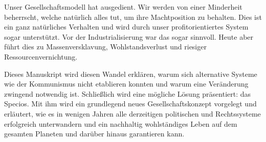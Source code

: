 Unser Gesellschaftsmodell hat ausgedient. Wir werden von einer Minderheit beherrscht, welche natürlich alles tut, um ihre Machtposition zu behalten. Dies ist ein ganz natürliches Verhalten und wird durch unser profitorientiertes System sogar unterstützt. Vor der Industrialisierung war das sogar sinnvoll. Heute aber führt dies zu Massenversklavung, Wohlstandsverlust und riesiger Ressourcenvernichtung.

Dieses Manuskript wird diesen Wandel erklären, warum sich alternative Systeme wie der Kommunismus nicht etablieren konnten und warum eine Veränderung zwingend notwendig ist. Schließlich wird eine mögliche Lösung präsentiert: das Specios. Mit ihm wird ein grundlegend neues Gesellschaftskonzept vorgelegt und erläutert, wie es in wenigen Jahren alle derzeitigen politischen und Rechtssysteme erfolgreich unterwandern und ein nachhaltig wohlständiges Leben auf dem gesamten Planeten und darüber hinaus garantieren kann.
